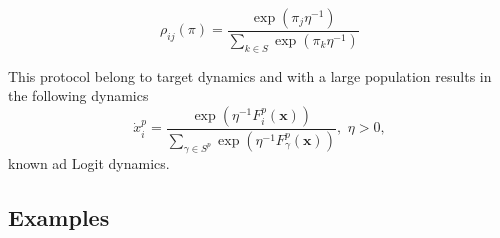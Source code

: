 \documentclass[a4paper,10pt]{article}
\newcommand{\bs}[1]{\boldsymbol{#1}}
\begin{document}
\begin{equation}
\rho_{ij}(\pi) = \frac{ \exp(\pi_j \eta^{-1} ) }{ \sum_{k \in S} \exp(\pi_k \eta^{-1} ) }
\end{equation}

This protocol belong to target dynamics and with a large population results in the following dynamics
\begin{equation}\label{eq:logit}
 \dot{x}_i^p = \frac{ \exp\left(\eta^{-1} F_i^p (\bs{x}) \right) }{ \sum_{\gamma \in S^p} \exp\left(\eta^{-1} F_\gamma^p (\bs{x}) \right) }, \, \, \eta>0,
\end{equation}
known ad Logit dynamics. 

\subsection{Examples}
\end{document}
